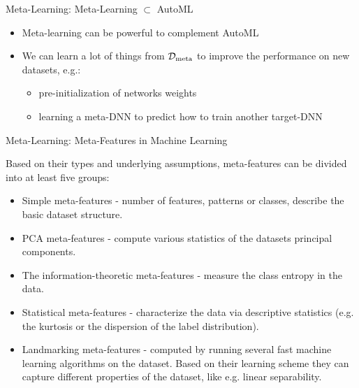 \begin{frame}[c]{Meta-Learning: Meta-Learning $\subset$ AutoML}

\begin{itemize}
	\item Meta-learning can be powerful to complement AutoML
	\pause
	\medskip
	\item We can learn a lot of things from $\mathcal{D}_{\text{meta}}$ to improve the performance on new datasets, e.g.:
	\begin{itemize}
		\item pre-initialization of networks weights
		\item learning a meta-DNN to predict how to train another target-DNN	\end{itemize}
\end{itemize}	

\end{frame}
\begin{frame}[c]{Meta-Learning: Meta-Features in Machine Learning}
	
Based on their types and underlying assumptions, meta-features can be divided into at least five groups:
\pause
\begin{itemize}
	\item \alert{Simple meta-features} - number of features, patterns or classes, describe the basic dataset structure. \pause
	\item \alert{PCA meta-features} - compute various statistics of the datasets principal components. \pause
	\item \alert{The information-theoretic meta-features} - measure the class
entropy in the data. \pause
	\item \alert{Statistical meta-features} - characterize the data via descriptive statistics (e.g. the kurtosis or the dispersion of the label distribution).\pause
	\item \alert{Landmarking meta-features} - computed by running several
fast machine learning algorithms on the dataset. Based on
their learning scheme they can capture different properties
of the dataset, like e.g. linear separability.
\end{itemize}

\end{frame}
